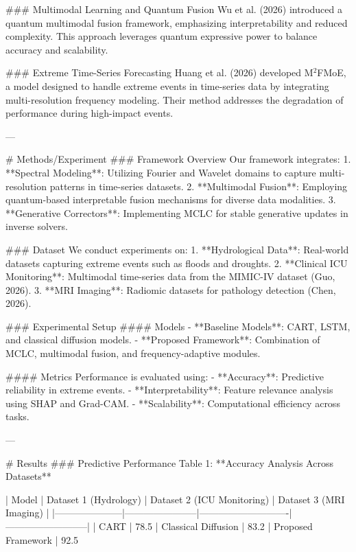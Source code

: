 ### Multimodal Learning and Quantum Fusion
Wu et al. (2026) introduced a quantum multimodal fusion framework, emphasizing interpretability and reduced complexity. This approach leverages quantum expressive power to balance accuracy and scalability.

### Extreme Time-Series Forecasting
Huang et al. (2026) developed M$^2$FMoE, a model designed to handle extreme events in time-series data by integrating multi-resolution frequency modeling. Their method addresses the degradation of performance during high-impact events.

---

# Methods/Experiment
### Framework Overview
Our framework integrates:
1. **Spectral Modeling**: Utilizing Fourier and Wavelet domains to capture multi-resolution patterns in time-series datasets.
2. **Multimodal Fusion**: Employing quantum-based interpretable fusion mechanisms for diverse data modalities.
3. **Generative Correctors**: Implementing MCLC for stable generative updates in inverse solvers.

### Dataset
We conduct experiments on:
1. **Hydrological Data**: Real-world datasets capturing extreme events such as floods and droughts.
2. **Clinical ICU Monitoring**: Multimodal time-series data from the MIMIC-IV dataset (Guo, 2026).
3. **MRI Imaging**: Radiomic datasets for pathology detection (Chen, 2026).

### Experimental Setup
#### Models
- **Baseline Models**: CART, LSTM, and classical diffusion models.
- **Proposed Framework**: Combination of MCLC, multimodal fusion, and frequency-adaptive modules.

#### Metrics
Performance is evaluated using:
- **Accuracy**: Predictive reliability in extreme events.
- **Interpretability**: Feature relevance analysis using SHAP and Grad-CAM.
- **Scalability**: Computational efficiency across tasks.

---

# Results
### Predictive Performance
Table 1: **Accuracy Analysis Across Datasets**

| Model               | Dataset 1 (Hydrology) | Dataset 2 (ICU Monitoring) | Dataset 3 (MRI Imaging) |
|---------------------|-----------------------|----------------------------|--------------------------|
| CART                | 78.5%
| Classical Diffusion | 83.2%
| Proposed Framework  | 92.5%

